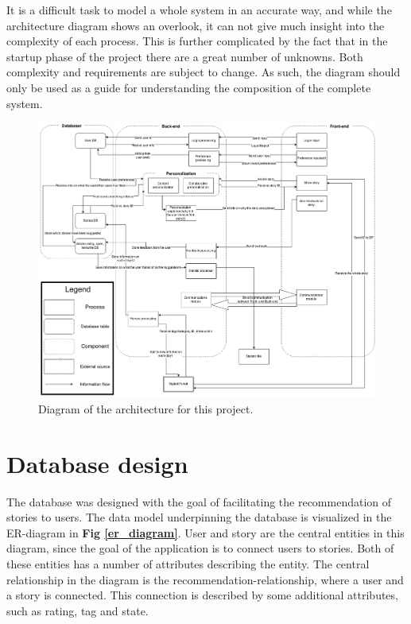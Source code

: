 It is a difficult task to model a whole system in an accurate way, and while the architecture diagram shows an overlook, it can not give much insight into the complexity of each process. This is further complicated by the fact that in the startup phase of the project there are a great number of unknowns. Both complexity and requirements are subject to change. As such, the diagram should only be used as a guide for understanding the composition of the complete system.

\begin{figure}[h!]
	\centering
	\includegraphics[width=\textwidth]{fig/architecture}
	\caption{Diagram of the architecture for this project.}
	\label{architecture}
\end{figure}

\section{Database design}
\label{sec_database_design}

The database was designed with the goal of facilitating the recommendation of stories to users. The data model underpinning the database is visualized in the ER-diagram in \textbf{Fig \ref{er_diagram}}. User and story are the central entities in this diagram, since the goal of the application is to connect users to stories. Both of these entities has a number of attributes describing the entity. The central relationship in the diagram is the recommendation-relationship, where a user and a story is connected. This connection is described by some additional attributes, such as rating, tag and state. \newline

